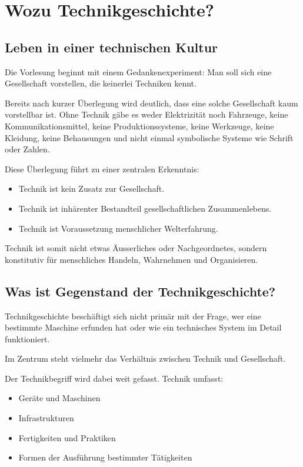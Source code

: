\section{Wozu Technikgeschichte?}

\subsection{Leben in einer technischen Kultur}

Die Vorlesung beginnt mit einem Gedankenexperiment: 
Man soll sich eine Gesellschaft vorstellen, die keinerlei Techniken kennt. 

Bereits nach kurzer Überlegung wird deutlich, dass eine solche Gesellschaft kaum vorstellbar ist. 
Ohne Technik gäbe es weder Elektrizität noch Fahrzeuge, keine Kommunikationsmittel, 
keine Produktionssysteme, keine Werkzeuge, keine Kleidung, keine Behausungen und 
nicht einmal symbolische Systeme wie Schrift oder Zahlen. 

Diese Überlegung führt zu einer zentralen Erkenntnis:

\begin{itemize}
    \item Technik ist kein Zusatz zur Gesellschaft.
    \item Technik ist inhärenter Bestandteil gesellschaftlichen Zusammenlebens.
    \item Technik ist Voraussetzung menschlicher Welterfahrung.
\end{itemize}

Technik ist somit nicht etwas Äusserliches oder Nachgeordnetes, sondern konstitutiv für 
menschliches Handeln, Wahrnehmen und Organisieren.

\subsection{Was ist Gegenstand der Technikgeschichte?}

Technikgeschichte beschäftigt sich nicht primär mit der Frage, 
wer eine bestimmte Maschine erfunden hat oder wie ein technisches System 
im Detail funktioniert. 

Im Zentrum steht vielmehr das Verhältnis zwischen Technik und Gesellschaft. 

Der Technikbegriff wird dabei weit gefasst. Technik umfasst:

\begin{itemize}
    \item Geräte und Maschinen
    \item Infrastrukturen
    \item Fertigkeiten und Praktiken
    \item Formen der Ausführung bestimmter Tätigkeiten
\end{itemize}

